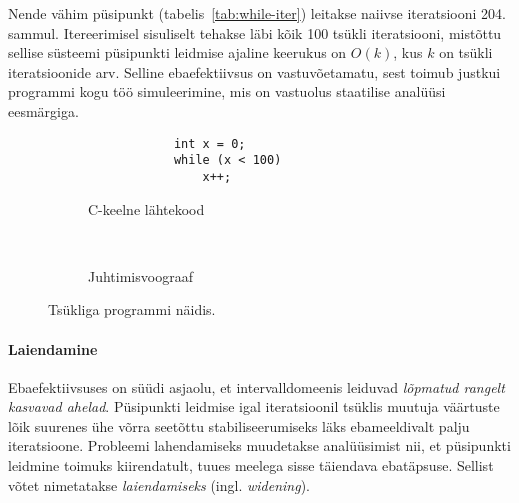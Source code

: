 \documentclass[../thesis.tex]{subfiles}
\begin{document}
Nende vähim püsipunkt (tabelis~\ref{tab:while-iter}) leitakse naiivse iteratsiooni 204. sammul. Itereerimisel sisuliselt tehakse läbi kõik 100 tsükli iteratsiooni, mistõttu sellise süsteemi püsipunkti leidmise ajaline keerukus on $O(k)$, kus $k$ on tsükli iteratsioonide arv. Selline ebaefektiivsus on vastuvõetamatu, sest toimub justkui programmi kogu töö simuleerimine, mis on vastuolus staatilise analüüsi eesmärgiga.

\begin{figure}
	\centering
	\begin{subfigure}[b]{0.4\textwidth}
		\centering
		\begin{verbatim}
			int x = 0;
			while (x < 100)
				x++;
		\end{verbatim}
		\caption{C-keelne lähtekood}
	\end{subfigure}
	~
	\begin{subfigure}[b]{0.4\textwidth}
		\centering
		\caption{Juhtimisvoograaf}
	\end{subfigure}

	\caption{Tsükliga programmi näidis.}
	\label{fig:prog-while}
\end{figure}

\paragraph{Laiendamine}
Ebaefektiivsuses on süüdi asjaolu, et intervalldomeenis leiduvad \emph{lõpmatud rangelt kasvavad ahelad}.
Püsipunkti leidmise igal iteratsioonil tsüklis muutuja väärtuste lõik suurenes ühe võrra seetõttu stabiliseerumiseks läks ebameeldivalt palju iteratsioone. Probleemi lahendamiseks muudetakse analüüsimist nii, et püsipunkti leidmine toimuks kiirendatult, tuues meelega sisse täiendava ebatäpsuse. Sellist võtet nimetatakse \emph{laiendamiseks} (ingl. \textit{widening}).
\end{document}
